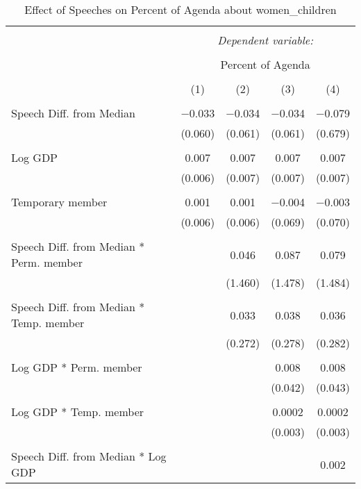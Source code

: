 
\begin{table}[!htbp] \centering 
  \caption{Effect of Speeches on Percent of Agenda about women_children} 
  \label{} 
\begin{tabular}{@{\extracolsep{5pt}}lcccc} 
\\[-1.8ex]\hline 
\hline \\[-1.8ex] 
 & \multicolumn{4}{c}{\textit{Dependent variable:}} \\ 
\cline{2-5} 
\\[-1.8ex] & \multicolumn{4}{c}{Percent of Agenda} \\ 
\\[-1.8ex] & (1) & (2) & (3) & (4)\\ 
\hline \\[-1.8ex] 
 Speech Diff. from Median & $-$0.033 & $-$0.034 & $-$0.034 & $-$0.079 \\ 
  & (0.060) & (0.061) & (0.061) & (0.679) \\ 
  & & & & \\ 
 Log GDP & 0.007 & 0.007 & 0.007 & 0.007 \\ 
  & (0.006) & (0.007) & (0.007) & (0.007) \\ 
  & & & & \\ 
 Temporary member & 0.001 & 0.001 & $-$0.004 & $-$0.003 \\ 
  & (0.006) & (0.006) & (0.069) & (0.070) \\ 
  & & & & \\ 
 Speech Diff. from Median * Perm. member &  & 0.046 & 0.087 & 0.079 \\ 
  &  & (1.460) & (1.478) & (1.484) \\ 
  & & & & \\ 
 Speech Diff. from Median * Temp. member &  & 0.033 & 0.038 & 0.036 \\ 
  &  & (0.272) & (0.278) & (0.282) \\ 
  & & & & \\ 
 Log GDP * Perm. member &  &  & 0.008 & 0.008 \\ 
  &  &  & (0.042) & (0.043) \\ 
  & & & & \\ 
 Log GDP * Temp. member &  &  & 0.0002 & 0.0002 \\ 
  &  &  & (0.003) & (0.003) \\ 
  & & & & \\ 
 Speech Diff. from Median * Log GDP &  &  &  & 0.002 \\ 

\end{tabular}
\end{table}
